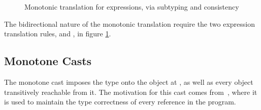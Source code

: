 \documentclass[a4paper,USenglish]{tex/lipics-v2016}
\begin{document}
\begin{figure}[!ht]
\begin{mathpar}

\end{mathpar}

\caption{Monotonic translation for expressions, via subtyping and consistency}
\label{fig:mono-trans3}
\end{figure}

The bidirectional nature of the monotonic translation require the two 
expression translation rules,  and , 
in figure \ref{fig:mono-trans3}.

\subsection{Monotone Casts}


The monotone cast \MonCast\C\a imposes the type \C onto the object
at \a, as well as every object transitively reachable from it. The motivation 
for this cast comes from~\cite{Siek2015}, where it is used to maintain the
type correctness of every reference in the program.
\end{document}
